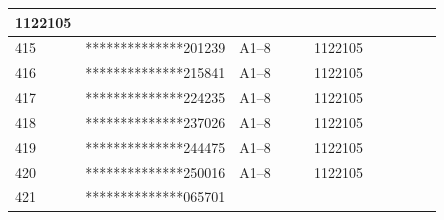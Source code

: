 \documentclass[UTF8,10pt,a4paper,fontset=fandol]{ctexart}
\newcommand{\fieldvalue}[1]{#1}
\begin{document}
\begin{center}
\begin{tabular}{|p{0.07\linewidth}|p{0.24\linewidth}|p{0.20\linewidth}|p{0.18\linewidth}|p{0.16\linewidth}|}
\fieldvalue{1122105} & \\
\hline
\fieldvalue{415} &
\fieldvalue{**************201239} &
\fieldvalue{A1--8} &
\fieldvalue{1122105} & \\
\hline
\fieldvalue{416} &
\fieldvalue{**************215841} &
\fieldvalue{A1--8} &
\fieldvalue{1122105} & \\
\hline
\fieldvalue{417} &
\fieldvalue{**************224235} &
\fieldvalue{A1--8} &
\fieldvalue{1122105} & \\
\hline
\fieldvalue{418} &
\fieldvalue{**************237026} &
\fieldvalue{A1--8} &
\fieldvalue{1122105} & \\
\hline
\fieldvalue{419} &
\fieldvalue{**************244475} &
\fieldvalue{A1--8} &
\fieldvalue{1122105} & \\
\hline
\fieldvalue{420} &
\fieldvalue{**************250016} &
\fieldvalue{A1--8} &
\fieldvalue{1122105} & \\
\hline
\fieldvalue{421} &
\fieldvalue{**************065701} &

\end{tabular}
\end{center}
\end{document}

